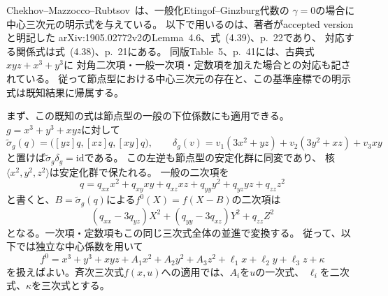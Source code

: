 \begin{remark}[節点型の既知の明示中心元との関係]
\label{rem:pg-cmr-nodal-comparison}
Chekhov--Mazzocco--Rubtsov~\cite{PCMR}は、一般化Etingof--Ginzburg代数の
$\gamma=0$の場合に中心三次元の明示式を与えている。
以下で用いるのは、著者がaccepted versionと明記した
arXiv:1905.02772v2のLemma~4.6、式~(4.39)、p.~22であり、
対応する関係式は式~(4.38)、p.~21にある。
同版Table~5、p.~41には、古典式$xyz+x^3+y^3$に
対角二次項・一般一次項・定数項を加えた場合との対応も記されている。
従って節点型における中心三次元の存在と、この基準座標での明示式は既知結果に帰属する。

まず、この既知の式は節点型の一般の下位係数にも適用できる。
$g=x^3+y^3+xyz$に対して
\begin{equation}
 \widetilde\sigma_g(q)
   =\bigl([yz]q,[xz]q,[xy]q\bigr),
 \qquad
 \delta_g(v)=v_1(3x^2+yz)+v_2(3y^2+xz)+v_3xy
 \label{eq:pg-cmr-alternative-centering}
\end{equation}
と置けば$\widetilde\sigma_g\delta_g=\mathrm{id}$である。
この左逆も節点型の安定化群に同変であり、
核$\langle x^2,y^2,z^2\rangle$は安定化群で保たれる。
一般の二次項を
\begin{equation}
 q=q_{xx}x^2+q_{xy}xy+q_{xz}xz+q_{yy}y^2+q_{yz}yz+q_{zz}z^2
 \label{eq:pg-cmr-general-quadratic}
\end{equation}
と書くと、$B=\widetilde\sigma_g(q)$による$f^0(X)=f(X-B)$の二次項は
\begin{equation}
 (q_{xx}-3q_{yz})X^2+(q_{yy}-3q_{xz})Y^2+q_{zz}Z^2
 \label{eq:pg-cmr-diagonal-quadratic}
\end{equation}
となる。一次項・定数項もこの同じ三次式全体の並進で変換する。
従って、以下では独立な中心係数を用いて
\begin{equation}
 f^0=x^3+y^3+xyz+A_1x^2+A_2y^2+A_3z^2
       +\ell_1x+\ell_2y+\ell_3z+\kappa
 \label{eq:pg-cmr-diagonal-potential}
\end{equation}
を扱えばよい。斉次三次式$f(x,u)$への適用では、$A_i$を$u$の一次式、
$\ell_i$を二次式、$\kappa$を三次式とする。


\end{remark}

